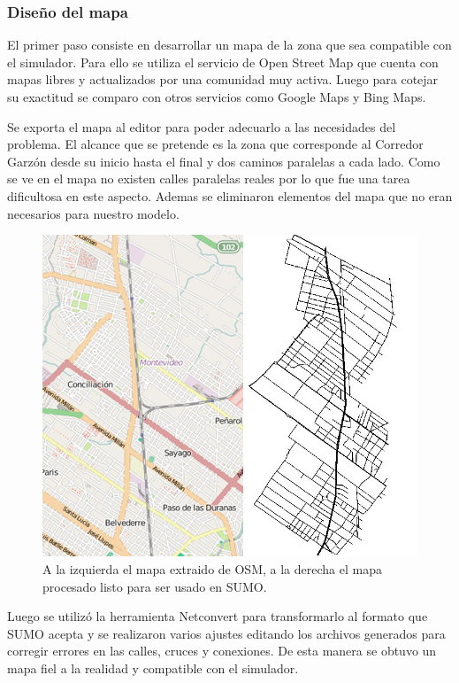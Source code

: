 \subsubsection{Diseño del mapa}

El primer paso consiste en desarrollar un mapa de la zona que sea compatible con el simulador. Para ello se utiliza el servicio de Open Street Map \citep{OSM} que cuenta con mapas libres y actualizados por una comunidad muy activa. Luego para cotejar su exactitud se comparo con otros servicios como Google Maps y Bing Maps.

Se exporta el mapa al editor \citet{JOSM} para poder adecuarlo a las necesidades del problema. El alcance que se pretende es la zona que corresponde al Corredor Garzón desde su inicio hasta el final y dos caminos paralelas a cada lado. Como se ve en el mapa no existen calles paralelas reales por lo que fue una tarea dificultosa en este aspecto. Ademas se eliminaron elementos del mapa que no eran necesarios para nuestro modelo. 

\begin{figure}[H]
	\centering
	\includegraphics[width=0.7\linewidth]{Figures/mapa_osm_sumo}
	\caption{A la izquierda el mapa extraido de OSM, a la derecha el mapa procesado listo para ser usado en SUMO.}
	\label{fig:mapa_osm_sumo}
\end{figure}

Luego se utilizó la herramienta Netconvert para transformarlo al formato que SUMO acepta y se realizaron varios ajustes editando los archivos generados para corregir errores en las calles, cruces y conexiones. De esta manera se obtuvo un mapa fiel a la realidad y compatible con el simulador.





